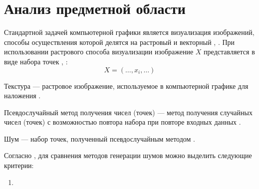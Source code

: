 \chapter{Анализ предметной области}


Стандартной задачей компьютерной графики является визуализация изображений, способы осуществления которой делятся на растровый и векторный \cite{Porev}, \cite{boreskov}.
При использовании растрового способа визуализации изображение $X$ представляется в виде набора точек \cite{boreskov}, \cite{Porev}:
\begin{equation}\label{eq:image_x}
	X=(\dots,x_i,\dots)
\end{equation}

Текстура --- растровое изображение, используемое в компьютерной графике для наложения \cite{smorkalov}.

Псевдослучайный метод получения чисел (точек) --- метод получения случайных чисел (точек) с возможностью повтора набора при повторе входных данных \cite{мухамеджанов2018генератор}.

Шум --- набор точек, полученный псевдослучайным методом \cite{petrova2022}.

Согласно \cite{}, для сравнения методов генерации шумов можно выделить следующие критерии:
\begin{enumerate}
	\item 
\end{enumerate}